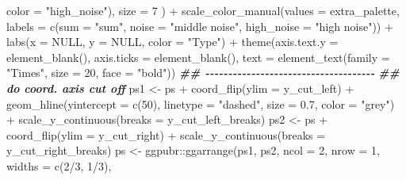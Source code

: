 \documentclass[
]{article}
\newenvironment{Shaded}{\begin{snugshade}}{\end{snugshade}}
\newcommand{\AttributeTok}[1]{\textcolor[rgb]{0.77,0.63,0.00}{#1}}
\newcommand{\ConstantTok}[1]{\textcolor[rgb]{0.00,0.00,0.00}{#1}}
\newcommand{\DecValTok}[1]{\textcolor[rgb]{0.00,0.00,0.81}{#1}}
\newcommand{\DocumentationTok}[1]{\textcolor[rgb]{0.56,0.35,0.01}{\textbf{\textit{#1}}}}
\newcommand{\FloatTok}[1]{\textcolor[rgb]{0.00,0.00,0.81}{#1}}
\newcommand{\FunctionTok}[1]{\textcolor[rgb]{0.00,0.00,0.00}{#1}}
\newcommand{\NormalTok}[1]{#1}
\newcommand{\OtherTok}[1]{\textcolor[rgb]{0.56,0.35,0.01}{#1}}
\newcommand{\SpecialCharTok}[1]{\textcolor[rgb]{0.00,0.00,0.00}{#1}}
\newcommand{\StringTok}[1]{\textcolor[rgb]{0.31,0.60,0.02}{#1}}
\begin{document}
\begin{Shaded}
\begin{Highlighting}[]
                         \AttributeTok{color =} \StringTok{"high\_noise"}\NormalTok{),}
                     \AttributeTok{size =} \DecValTok{7}
\NormalTok{                     ) }\SpecialCharTok{+}
        \FunctionTok{scale\_color\_manual}\NormalTok{(}\AttributeTok{values =}\NormalTok{ extra\_palette,}
                           \AttributeTok{labels =} \FunctionTok{c}\NormalTok{(}\AttributeTok{sum =} \StringTok{"sum"}\NormalTok{, }\AttributeTok{noise =} \StringTok{"middle noise"}\NormalTok{, }\AttributeTok{high\_noise =} \StringTok{"high noise"}\NormalTok{)) }\SpecialCharTok{+}
        \FunctionTok{labs}\NormalTok{(}\AttributeTok{x =} \ConstantTok{NULL}\NormalTok{, }\AttributeTok{y =} \ConstantTok{NULL}\NormalTok{, }\AttributeTok{color =} \StringTok{"Type"}\NormalTok{) }\SpecialCharTok{+}
        \FunctionTok{theme}\NormalTok{(}\AttributeTok{axis.text.y =} \FunctionTok{element\_blank}\NormalTok{(),}
              \AttributeTok{axis.ticks =} \FunctionTok{element\_blank}\NormalTok{(),}
              \AttributeTok{text =} \FunctionTok{element\_text}\NormalTok{(}\AttributeTok{family =} \StringTok{"Times"}\NormalTok{, }\AttributeTok{size =} \DecValTok{20}\NormalTok{, }\AttributeTok{face =} \StringTok{"bold"}\NormalTok{))}
    \DocumentationTok{\#\# {-}{-}{-}{-}{-}{-}{-}{-}{-}{-}{-}{-}{-}{-}{-}{-}{-}{-}{-}{-}{-}{-}{-}{-}{-}{-}{-}{-}{-}{-}{-}{-}{-}{-}{-}{-}{-} }
    \DocumentationTok{\#\# do coord. axis cut off}
\NormalTok{    ps1 }\OtherTok{\textless{}{-}}\NormalTok{ ps }\SpecialCharTok{+} 
      \FunctionTok{coord\_flip}\NormalTok{(}\AttributeTok{ylim =}\NormalTok{ y\_cut\_left) }\SpecialCharTok{+}
      \FunctionTok{geom\_hline}\NormalTok{(}\AttributeTok{yintercept =} \FunctionTok{c}\NormalTok{(}\DecValTok{50}\NormalTok{), }\AttributeTok{linetype =} \StringTok{"dashed"}\NormalTok{, }\AttributeTok{size =} \FloatTok{0.7}\NormalTok{,}
                 \AttributeTok{color =} \StringTok{"grey"}\NormalTok{) }\SpecialCharTok{+}
      \FunctionTok{scale\_y\_continuous}\NormalTok{(}\AttributeTok{breaks =}\NormalTok{ y\_cut\_left\_breaks)}
\NormalTok{    ps2 }\OtherTok{\textless{}{-}}\NormalTok{ ps }\SpecialCharTok{+}
      \FunctionTok{coord\_flip}\NormalTok{(}\AttributeTok{ylim =}\NormalTok{ y\_cut\_right) }\SpecialCharTok{+}
      \FunctionTok{scale\_y\_continuous}\NormalTok{(}\AttributeTok{breaks =}\NormalTok{ y\_cut\_right\_breaks)}
\NormalTok{    ps }\OtherTok{\textless{}{-}}\NormalTok{ ggpubr}\SpecialCharTok{::}\FunctionTok{ggarrange}\NormalTok{(ps1, ps2, }\AttributeTok{ncol =} \DecValTok{2}\NormalTok{, }\AttributeTok{nrow =} \DecValTok{1}\NormalTok{,}
                            \AttributeTok{widths =} \FunctionTok{c}\NormalTok{(}\DecValTok{2}\SpecialCharTok{/}\DecValTok{3}\NormalTok{, }\DecValTok{1}\SpecialCharTok{/}\DecValTok{3}\NormalTok{),}

\end{Highlighting}
\end{Shaded}
\end{document}

